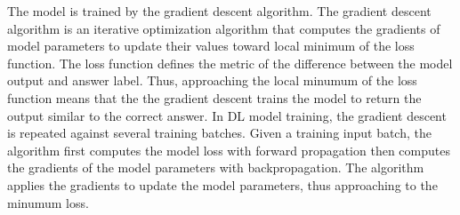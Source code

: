  

The model is trained by the gradient descent algorithm. 
The gradient descent algorithm is an iterative optimization algorithm
that computes the gradients of model parameters to update their values toward
local minimum of the loss function.
The loss function defines the metric of the difference between the model 
output and answer label.
Thus, approaching the local minumum of the loss function means that the
the gradient descent trains the model to return the output similar to the
correct answer.
In DL model training, the gradient descent is repeated against several
training batches. Given a training input batch, the algorithm first computes
the model loss with forward propagation then computes the gradients of the
model parameters with backpropagation. The algorithm applies the gradients
to update the model parameters, thus approaching to the minumum loss.

